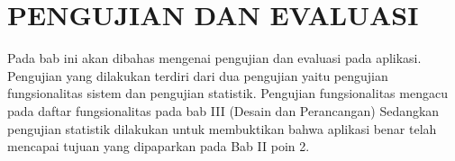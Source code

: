 	\chapter{PENGUJIAN DAN EVALUASI}

	Pada bab ini akan dibahas mengenai pengujian dan evaluasi pada aplikasi. Pengujian yang dilakukan terdiri dari dua pengujian yaitu pengujian fungsionalitas sistem dan pengujian statistik. Pengujian fungsionalitas mengacu pada daftar fungsionalitas pada bab III (Desain dan Perancangan) Sedangkan pengujian statistik dilakukan untuk membuktikan bahwa aplikasi benar telah mencapai tujuan yang dipaparkan pada Bab II poin 2.
    
      
    
    
    
    
